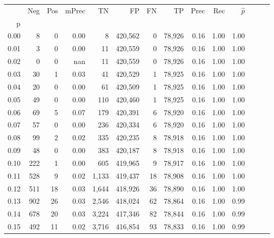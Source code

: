\begin{tabular}{rrrrrrrrrrrrrr}
\toprule
{} &     Neg &    Pos & mPrec &       TN &       FP &      FN &      TP &  Prec &   Rec & $\hat{p}$ \\
p    &         &        &       &          &          &         &         &       &       &           \\
\midrule
0.00 &       8 &      0 &  0.00 &        8 &  420,562 &       0 &  78,926 &  0.16 &  1.00 &      1.00 \\
0.01 &       3 &      0 &  0.00 &       11 &  420,559 &       0 &  78,926 &  0.16 &  1.00 &      1.00 \\
0.02 &       0 &      0 &   nan &       11 &  420,559 &       0 &  78,926 &  0.16 &  1.00 &      1.00 \\
0.03 &      30 &      1 &  0.03 &       41 &  420,529 &       1 &  78,925 &  0.16 &  1.00 &      1.00 \\
0.04 &      20 &      0 &  0.00 &       61 &  420,509 &       1 &  78,925 &  0.16 &  1.00 &      1.00 \\
0.05 &      49 &      0 &  0.00 &      110 &  420,460 &       1 &  78,925 &  0.16 &  1.00 &      1.00 \\
0.06 &      69 &      5 &  0.07 &      179 &  420,391 &       6 &  78,920 &  0.16 &  1.00 &      1.00 \\
0.07 &      57 &      0 &  0.00 &      236 &  420,334 &       6 &  78,920 &  0.16 &  1.00 &      1.00 \\
0.08 &      99 &      2 &  0.02 &      335 &  420,235 &       8 &  78,918 &  0.16 &  1.00 &      1.00 \\
0.09 &      48 &      0 &  0.00 &      383 &  420,187 &       8 &  78,918 &  0.16 &  1.00 &      1.00 \\
0.10 &     222 &      1 &  0.00 &      605 &  419,965 &       9 &  78,917 &  0.16 &  1.00 &      1.00 \\
0.11 &     528 &      9 &  0.02 &    1,133 &  419,437 &      18 &  78,908 &  0.16 &  1.00 &      1.00 \\
0.12 &     511 &     18 &  0.03 &    1,644 &  418,926 &      36 &  78,890 &  0.16 &  1.00 &      1.00 \\
0.13 &     902 &     26 &  0.03 &    2,546 &  418,024 &      62 &  78,864 &  0.16 &  1.00 &      0.99 \\
0.14 &     678 &     20 &  0.03 &    3,224 &  417,346 &      82 &  78,844 &  0.16 &  1.00 &      0.99 \\
0.15 &     492 &     11 &  0.02 &    3,716 &  416,854 &      93 &  78,833 &  0.16 &  1.00 &      0.99 \\

\end{tabular}
